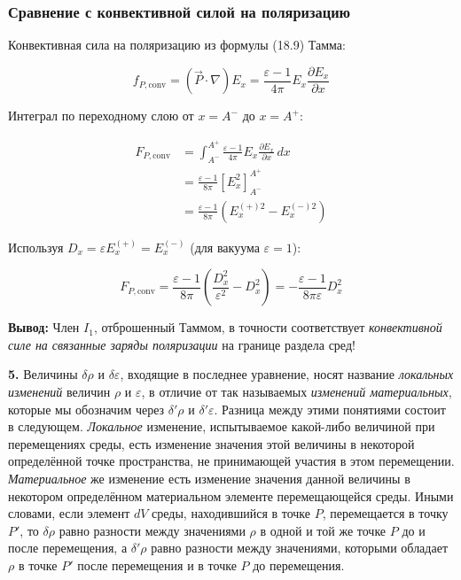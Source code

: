 \documentclass[a4paper,10pt]{article}
\newcommand{\modblock}[1]{\colorbox{modcolor!10}{\parbox{\dimexpr\linewidth-2\fboxsep}{#1}}}
\begin{document}
\modblock{

\subsubsection{Сравнение с конвективной силой на поляризацию}

Конвективная сила на поляризацию из формулы (18.9) Тамма:

\begin{equation}
f_{P,\text{conv}} = (\vec{P}\cdot\nabla)E_x =
\frac{\varepsilon-1}{4\pi}E_x\frac{\partial E_x}{\partial x}
\label{eq:convective_force_polarization}
\end{equation}

Интеграл по переходному слою от $x = A^-$ до $x = A^+$:

\begin{equation}
\begin{aligned}
F_{P,\text{conv}} &= \int_{A^-}^{A^+} \frac{\varepsilon-1}{4\pi}E_x\frac{\partial E_x}{\partial x}\,dx \\
&= \frac{\varepsilon-1}{8\pi}\left[E_x^2\right]_{A^-}^{A^+} \\
&= \frac{\varepsilon-1}{8\pi}\left(E_x^{(+)2} - E_x^{(-)2}\right)
\end{aligned}
\label{eq:convective_integrated}
\end{equation}

Используя $D_x = \varepsilon E_x^{(+)} = E_x^{(-)}$ (для вакуума $\varepsilon=1$):

\begin{equation}
F_{P,\text{conv}} = \frac{\varepsilon-1}{8\pi}\left(\frac{D_x^2}{\varepsilon^2} - D_x^2\right) =
-\frac{\varepsilon-1}{8\pi\varepsilon}D_x^2
\label{eq:convective_via_D}
\end{equation}

\textbf{Вывод:} Член $I_1$, отброшенный Таммом, в точности соответствует
\textit{конвективной силе на связанные заряды поляризации} на границе
раздела сред!
}



\textbf{5.} Величины $\delta\rho$ и $\delta\varepsilon$, входящие в
последнее уравнение, носят название \textit{локальных изменений} величин
$\rho$ и $\varepsilon$, в отличие от так называемых \textit{изменений
материальных}, которые мы обозначим через $\delta'\rho$ и $\delta'\varepsilon$.
Разница между этими понятиями состоит в следующем. \textit{Локальное}
изменение, испытываемое какой-либо величиной при перемещениях среды,
есть изменение значения этой величины в некоторой определённой точке
пространства, не принимающей участия в этом перемещении.
\textit{Материальное} же изменение есть изменение значения данной
величины в некотором определённом материальном элементе перемещающейся
среды. Иными словами, если элемент $dV$ среды, находившийся в точке $P$,
перемещается в точку $P'$, то $\delta\rho$ равно разности между
значениями $\rho$ в одной и той же точке $P$ до и после перемещения,
а $\delta'\rho$ равно разности между значениями, которыми обладает $\rho$
в точке $P'$ после перемещения и в точке $P$ до перемещения.
\end{document}

